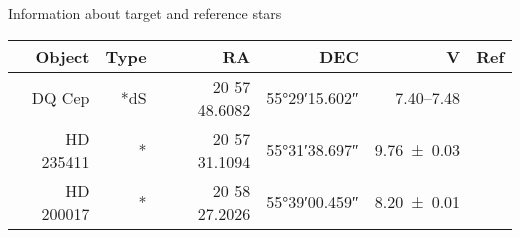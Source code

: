 
\caption{Information about target and reference stars}
\begin{tabular}{rrrrrr}
	\hline
	Object & Type &            RA &                DEC &                      V &                        Ref \\ \hline\hline
	DQ Cep &  *dS & 20 57 48.6082 & \ang{55;29;15.602} & \SIrange{7.40}{7.48}{} & \cite{1971GCVS3.C......0K} \\
	HD 235411 &    * & 20 57 31.1094 & \ang{55;31;38.697} &     \SI{9.76\pm0.03}{} &  \cite{2000AA...355L..27H} \\
	HD 200017 &    * & 20 58 27.2026 & \ang{55;39;00.459} &     \SI{8.20\pm0.01}{} &  \cite{2000AA...355L..27H} \\ \hline
\end{tabular}